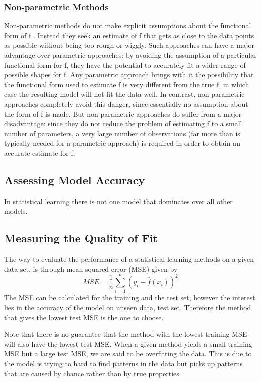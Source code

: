 \documentclass[12pt]{article}
\numberwithin{equation}{section}
\begin{document}
\subsubsection{Non-parametric Methods}
Non-parametric methods do not make explicit assumptions about the functional form of f . Instead they seek an estimate of f that gets as close to the data points as possible without being too rough or wiggly. Such approaches can have a major advantage over parametric approaches: by avoiding the assumption of a particular functional form for f, they have the potential to accurately fit a wider range of possible shapes for f. Any parametric approach brings with it the possibility that the functional form used to estimate f is very different from the true f, in which case the resulting model will not fit the data well. In contrast, non-parametric approaches completely avoid this danger, since essentially no assumption about the form of f is made. But non-parametric approaches do suffer from a major disadvantage: since they do not reduce the problem of estimating f to a small number of parameters, a very large number of observations (far more than is typically needed for a parametric approach) is required in order to obtain an accurate estimate for f.
\subsection{Assessing Model Accuracy}
In statistical learning there is not one model that dominates over all other models.
\subsection{Measuring the Quality of Fit}
The way to evaluate the performance of a statistical learning methods on a given data set, is through mean squared error (MSE) given by
\begin{equation}
    MSE = \frac{1}{n} \sum_{i = 1}^{n}(y_i-\hat{f}(x_i))^2
\end{equation}
The MSE can be calculated for the training and the test set, however the interest lies in the accuracy of the model on unseen data, test set. Therefore the method that gives the lowest test MSE is the one to choose.

Note that there is no guarantee that the method with the lowest training MSE will also have the lowest test MSE. When a given method yields a small training MSE but a large test MSE, we are said to be overfitting the data. This is due to the model is trying to hard to find patterns in the data but picks up patterns that are caused by chance rather than by true properties.
\end{document}
